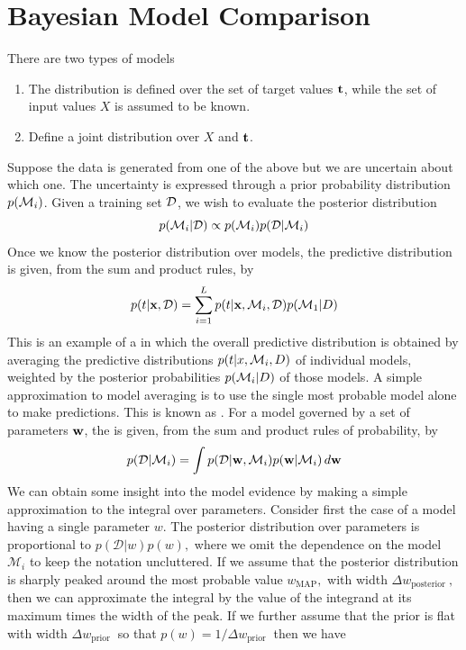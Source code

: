 \documentclass[11pt]{article}
\numberwithin{equation}{section}
\begin{document}
\section{Bayesian Model Comparison}
There are two types of models
\begin{enumerate}
	\item The distribution is defined over the set of target values $\textbf{t}$, while the set of input values $X$ is assumed to be known.
	\item Define a joint distribution over $X$ and $\textbf{t}$.
\end{enumerate}
Suppose the data is generated from one of the above but we are uncertain about which one. The uncertainty is expressed through a prior probability distribution $p(\mathcal{M}_i)$. Given a training set $\mathcal{D}$, we wish to evaluate the posterior distribution
\begin{equation}
	p(\mathcal{M}_i|\mathcal{D}) \propto p(\mathcal{M}_i)p(\mathcal{D}|\mathcal{M}_i)
\end{equation}
Once we know the posterior distribution over models, the predictive distribution is given, from the sum and product rules, by
\begin{equation}
	p(t|\textbf{x}, \mathcal{D}) = \sum_{i=1}^L p(t|\textbf{x}, \mathcal{M}_i, \mathcal{D})p(\mathcal{M}_1 | D)
\end{equation}
This is an example of a  in which the overall predictive distribution is obtained by averaging the predictive distributions $p(t|x, \mathcal{M}_i, D)$ of individual models, weighted by the posterior probabilities $p(\mathcal{M}_i|D)$ of those models.
A simple approximation to model averaging is to use the single most probable model alone to make predictions. This is known as .
For a model governed by a set of parameters $\textbf{w}$, the  is given, from the sum and product rules of probability, by
\begin{equation}
	p(\mathcal{D}|\mathcal{M}_i) = \int p(\mathcal{D}|\textbf{w}, \mathcal{M}_i)p(\textbf{w} | \mathcal{M}_i)\,d\textbf{w}
\end{equation}
We can obtain some insight into the model evidence by making a simple approximation to the integral over parameters. Consider first the case of a model having a single parameter $w .$ The posterior distribution over parameters is proportional to $p(\mathcal{D} | w) p(w),$ where we omit the dependence on the model $\mathcal{M}_{i}$ to keep the notation uncluttered. If we assume that the posterior distribution is sharply peaked around the most probable value $w_{\mathrm{MAP}},$ with width $\Delta w_{\text {posterior }},$ then we can approximate the integral by the value of the integrand at its maximum times the width of the peak. If we further assume that the prior is flat with width $\Delta w_{\text {prior }}$ so that $p(w)=1 / \Delta w_{\text {prior }}$ then we have
\end{document}
